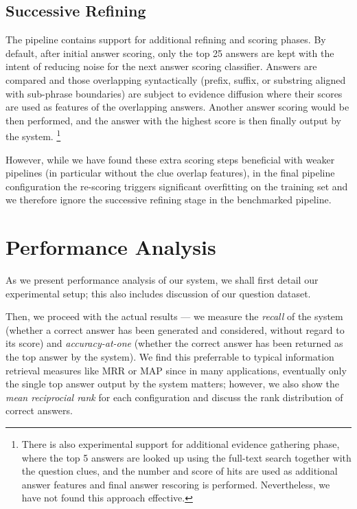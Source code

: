 \subsection{Successive Refining}

The pipeline contains support for additional refining and scoring phases.
By default, after initial answer scoring,
only the top 25 answers are kept with the intent of reducing noise for the next answer scoring classifier.
Answers are compared and those overlapping syntactically (prefix, suffix, or substring aligned with sub-phrase boundaries)
are subject to evidence diffusion where their scores are used as features of the overlapping answers.
Another answer scoring would be then performed, and the answer with the highest score is then finally output by the system.%
\footnote{There is also experimental support for additional evidence gathering phase, where the top 5 answers are looked up using the full-text search together with the question clues, and the number and score of hits are used as additional answer features and final answer rescoring is performed.  Nevertheless, we have not found this approach effective.}

However, while we have found these extra scoring steps beneficial with
weaker pipelines (in particular without the clue overlap features),
in the final pipeline configuration the re-scoring triggers significant
overfitting on the training set and we therefore ignore
the successive refining stage in the benchmarked pipeline.


\section{Performance Analysis}
\label{sec:results}

As we present performance analysis of our system,
we shall first detail our experimental setup;
this also includes discussion of our question dataset.

Then, we proceed with the actual results --- we measure the \textit{recall}
of the system (whether a correct answer has been generated and considered,
without regard to its score) and \textit{accuracy-at-one} (whether the
correct answer has been returned as the top answer by the system).
We find this preferrable to typical information retrieval measures like MRR or MAP
since in many applications, eventually only the single top answer output by the system
matters; however, we also show the \textit{mean reciprocial rank}
for each configuration and discuss the rank distribution of correct answers.

